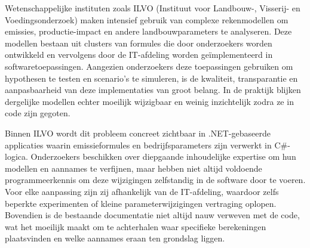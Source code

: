



Wetenschappelijke instituten zoals ILVO (Instituut voor Landbouw-, Visserij- en Voedingsonderzoek) maken intensief gebruik van complexe rekenmodellen om emissies, productie-impact en andere landbouwparameters te analyseren. Deze modellen bestaan uit clusters van formules die door onderzoekers worden ontwikkeld en vervolgens door de IT-afdeling worden geïmplementeerd in softwaretoepassingen. Aangezien onderzoekers deze toepassingen gebruiken om hypothesen te testen en scenario’s te simuleren, is de kwaliteit, transparantie en aanpasbaarheid van deze implementaties van groot belang. In de praktijk blijken dergelijke modellen echter moeilijk wijzigbaar en weinig inzichtelijk zodra ze in code zijn gegoten.

Binnen ILVO wordt dit probleem concreet zichtbaar in .NET-gebaseerde applicaties waarin emissieformules en bedrijfsparameters zijn verwerkt in C\#-logica. Onderzoekers beschikken over diepgaande inhoudelijke expertise om hun modellen en aannames te verfijnen, maar hebben niet altijd voldoende programmeerkennis om deze wijzigingen zelfstandig in de software door te voeren. Voor elke aanpassing zijn zij afhankelijk van de IT-afdeling, waardoor zelfs beperkte experimenten of kleine parameterwijzigingen vertraging oplopen. Bovendien is de bestaande documentatie niet altijd nauw verweven met de code, wat het moeilijk maakt om te achterhalen waar specifieke berekeningen plaatsvinden en welke aannames eraan ten grondslag liggen.

